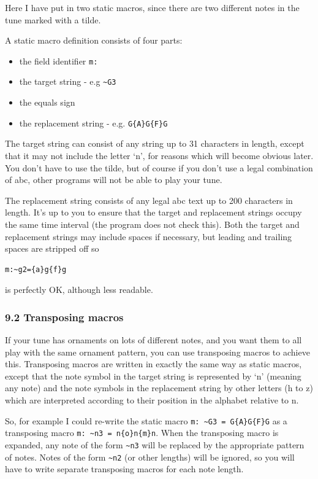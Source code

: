 \documentclass[oneside]{book}
\begin{document}
Here I have put in two static macros, since there are two different
notes in the tune marked with a tilde.

A static macro definition consists of four parts:

\begin{itemize}
\item
  the field identifier \texttt{m:}
\item
  the target string - e.g \texttt{\textasciitilde{}G3}
\item
  the equals sign
\item
  the replacement string - e.g. \texttt{G\{A\}G\{F\}G}
\end{itemize}

The target string can consist of any string up to 31 characters in
length, except that it may not include the letter `n', for reasons which
will become obvious later. You don't have to use the tilde, but of
course if you don't use a legal combination of abc, other programs will
not be able to play your tune.

The replacement string consists of any legal abc text up to 200
characters in length. It's up to you to ensure that the target and
replacement strings occupy the same time interval (the program does not
check this). Both the target and replacement strings may include spaces
if necessary, but leading and trailing spaces are stripped off so

\begin{verbatim}
m:~g2={a}g{f}g
\end{verbatim}

is perfectly OK, although less readable.

\hypertarget{transposing_macros}{\subsubsection{9.2 Transposing
macros}\label{transposing_macros}}

If your tune has ornaments on lots of different notes, and you want them
to all play with the same ornament pattern, you can use transposing
macros to achieve this. Transposing macros are written in exactly the
same way as static macros, except that the note symbol in the target
string is represented by `n' (meaning any note) and the note symbols in
the replacement string by other letters (h to z) which are interpreted
according to their position in the alphabet relative to n.

So, for example I could re-write the static macro
\texttt{m:\ \textasciitilde{}G3\ =\ G\{A\}G\{F\}G} as a transposing
macro \texttt{m:\ \textasciitilde{}n3\ =\ n\{o\}n\{m\}n}. When the
transposing macro is expanded, any note of the form
\texttt{\textasciitilde{}n3} will be replaced by the appropriate pattern
of notes. Notes of the form \texttt{\textasciitilde{}n2} (or other
lengths) will be ignored, so you will have to write separate transposing
macros for each note length.
\end{document}
